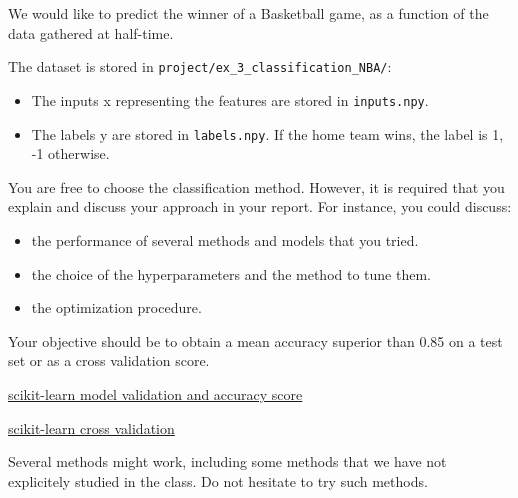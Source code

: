 \documentclass[10pt, a4paper]{article}
\begin{document}
\begin{Problem}
    We would like to predict the winner of a Basketball game, as a function of the data gathered at half-time.

    The dataset is stored in \verb|project/ex_3_classification_NBA/|:
    \begin{itemize}
        \item The inputs x representing the features are stored in \verb|inputs.npy|.
        \item The labels y are stored in \verb|labels.npy|. If the home team wins, the label is 1, -1 otherwise.
    \end{itemize}

    You are free to choose the classification method. However, it is required that you explain and discuss your approach in your report. For instance, you could discuss:
    \begin{itemize}
        \item the performance of several methods and models that you tried.
        \item the choice of the hyperparameters and the method to tune them.
        \item the optimization procedure.
    \end{itemize}

    Your objective should be to obtain a mean accuracy superior than 0.85 on a test set or as a cross validation score.

    \href{https://scikit-learn.org/stable/modules/model_evaluation.html#accuracy-score}{scikit-learn model validation and accuracy score}

    \href{https://scikit-learn.org/stable/modules/cross_validation.html}{scikit-learn cross validation}

    Several methods might work, including some methods that we have not explicitely studied in the class. Do not hesitate to try such methods.
\end{Problem}
\end{document}
